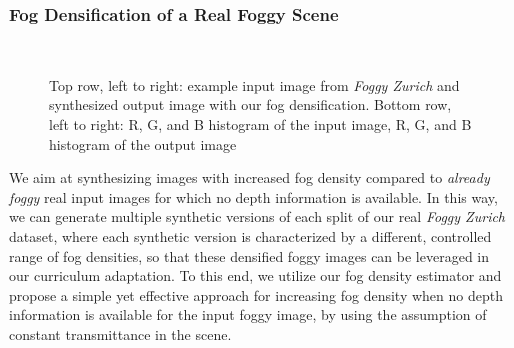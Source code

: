 \documentclass[twocolumn]{svjour3}          \smartqed  \usepackage{graphicx}
\begin{document}
\subsubsection{Fog Densification of a Real Foggy Scene}
\label{sec:fog:densification}

\begin{figure*}[tb]
  \centering
  \hfil
  \\
  \hfil
  \hfil
  \hfil
  \hfil
  \hfil
  \caption{Top row, left to right: example input image from \emph{Foggy Zurich} and synthesized output image with our fog densification. Bottom row, left to right: R, G, and B histogram of the input image, R, G, and B histogram of the output image}
  \label{fig:fog:densification:example}
\end{figure*}

We aim at synthesizing images with increased fog density compared to \emph{already foggy} real input images for which no depth information is available. In this way, we can generate multiple synthetic versions of each split of our real \emph{Foggy Zurich} dataset, where each synthetic version is characterized by a different, controlled range of fog densities, so that these densified foggy images can be leveraged in our curriculum adaptation. To this end, we utilize our fog density estimator and propose a simple yet effective approach for increasing fog density when no depth information is available for the input foggy image, by using the assumption of constant transmittance in the scene.
\end{document}
